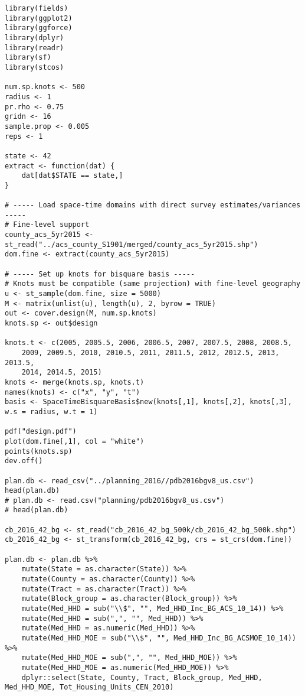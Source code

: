\documentclass[12pt]{article}
\begin{document}
\begin{scriptsize}
\begin{verbatim}
library(fields)
library(ggplot2)
library(ggforce)
library(dplyr)
library(readr)
library(sf)
library(stcos)

num.sp.knots <- 500
radius <- 1
pr.rho <- 0.75
gridn <- 16
sample.prop <- 0.005
reps <- 1

state <- 42
extract <- function(dat) {
    dat[dat$STATE == state,]
}

# ----- Load space-time domains with direct survey estimates/variances -----
# Fine-level support
county_acs_5yr2015 <- st_read("../acs_county_S1901/merged/county_acs_5yr2015.shp")
dom.fine <- extract(county_acs_5yr2015)

# ----- Set up knots for bisquare basis -----
# Knots must be compatible (same projection) with fine-level geography
u <- st_sample(dom.fine, size = 5000)
M <- matrix(unlist(u), length(u), 2, byrow = TRUE)
out <- cover.design(M, num.sp.knots)
knots.sp <- out$design

knots.t <- c(2005, 2005.5, 2006, 2006.5, 2007, 2007.5, 2008, 2008.5,
    2009, 2009.5, 2010, 2010.5, 2011, 2011.5, 2012, 2012.5, 2013, 2013.5,
    2014, 2014.5, 2015)
knots <- merge(knots.sp, knots.t)
names(knots) <- c("x", "y", "t")
basis <- SpaceTimeBisquareBasis$new(knots[,1], knots[,2], knots[,3], w.s = radius, w.t = 1)

pdf("design.pdf")
plot(dom.fine[,1], col = "white")
points(knots.sp)
dev.off()

plan.db <- read_csv("../planning_2016//pdb2016bgv8_us.csv")
head(plan.db)
# plan.db <- read.csv("planning/pdb2016bgv8_us.csv")
# head(plan.db)

cb_2016_42_bg <- st_read("cb_2016_42_bg_500k/cb_2016_42_bg_500k.shp")
cb_2016_42_bg <- st_transform(cb_2016_42_bg, crs = st_crs(dom.fine))

plan.db <- plan.db %>%
    mutate(State = as.character(State)) %>%
    mutate(County = as.character(County)) %>%
    mutate(Tract = as.character(Tract)) %>%
    mutate(Block_group = as.character(Block_group)) %>%
    mutate(Med_HHD = sub("\\$", "", Med_HHD_Inc_BG_ACS_10_14)) %>%
    mutate(Med_HHD = sub(",", "", Med_HHD)) %>%
    mutate(Med_HHD = as.numeric(Med_HHD)) %>%
    mutate(Med_HHD_MOE = sub("\\$", "", Med_HHD_Inc_BG_ACSMOE_10_14)) %>%
    mutate(Med_HHD_MOE = sub(",", "", Med_HHD_MOE)) %>%
    mutate(Med_HHD_MOE = as.numeric(Med_HHD_MOE)) %>%
    dplyr::select(State, County, Tract, Block_group, Med_HHD, Med_HHD_MOE, Tot_Housing_Units_CEN_2010)


\end{verbatim}
\end{scriptsize}
\end{document}
